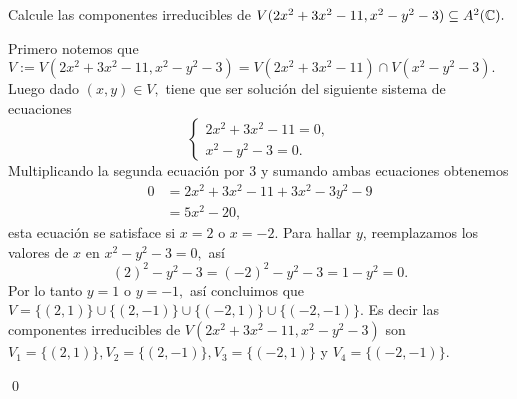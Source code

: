 \begin{homeworkProblem}
    Calcule las componentes irreducibles de $V(2x^2+3x^2-11,x^2-y^2-3)\subseteq A^2(\mathbb{C}).$
    \begin{solucion}
        Primero notemos que $V:=V(2x^2+3x^2-11,x^2-y^2-3)=V(2x^2+3x^2-11)\cap V(x^2-y^2-3).$ Luego dado $(x,y)\in V,$ tiene que ser solución del siguiente sistema de ecuaciones
        $$
            \begin{cases}
                2x^2+3x^2-11=0,\\
                x^2-y^2-3=0.
            \end{cases}
        $$
        Multiplicando la segunda ecuación por 3 y sumando ambas ecuaciones obtenemos
        \begin{align*}
            0&=2x^2+3x^2-11+3x^2-3y^2-9\\
            &=5x^2-20,
        \end{align*}
         esta ecuación se satisface si $x=2$ o $x=-2.$ Para hallar $y$, reemplazamos los valores de $x$ en $x^2-y^2-3=0,$ así
         $$(2)^2-y^2-3=(-2)^2-y^2-3=1-y^2=0.$$
         Por lo tanto $y=1$ o $y=-1,$ así concluimos que $V=\{(2,1)\}\cup\{(2,-1)\}\cup\{(-2,1)\}\cup\{(-2,-1)\}.$ Es decir las componentes irreducibles de $V(2x^2+3x^2-11,x^2-y^2-3)$ son $V_1=\{(2,1)\},V_2=\{(2,-1)\},V_3=\{(-2,1)\}$ y $V_4=\{(-2,-1)\}.$
         
         \qed
    \end{solucion}
\end{homeworkProblem}

